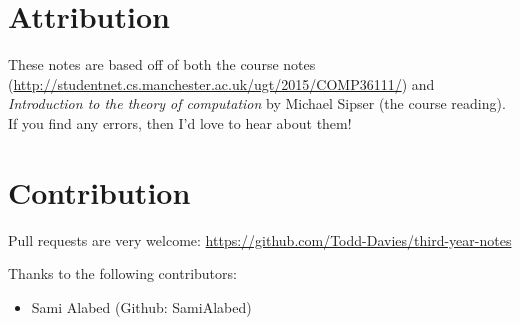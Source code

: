 \section*{Attribution}

These notes are based off of both the course notes
(\url{http://studentnet.cs.manchester.ac.uk/ugt/2015/COMP36111/}) and
\textit{Introduction to the theory of computation} by Michael Sipser (the course
reading). If you find any errors, then I'd love to hear about them!

\section*{Contribution}

Pull requests are very welcome:
\url{https://github.com/Todd-Davies/third-year-notes}

Thanks to the following contributors:
\begin{itemize}
\item{Sami Alabed (Github: SamiAlabed)}
\end{itemize}